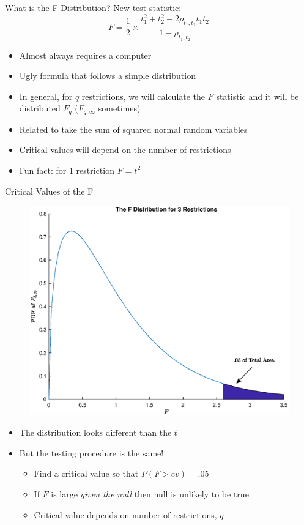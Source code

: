 \begin{frame}{What is the F Distribution?}
New test statistic:
		\[
			F = \frac{1}{2}\times\frac{t_1^2 + t_2^2 - 2\rho_{t_1,t_2}t_1t_2}{1-\rho_{t_1,t_2}}
		\]

\begin{itemize}
	\item Almost always requires a computer
	\item Ugly formula that follows a simple distribution
	\item In general, for $q$ restrictions, we will calculate the $F$ statistic and it will be distributed $F_q$ ($F_{q,\infty}$ sometimes)
	\item Related to take the sum of squared normal random variables
	\item Critical values will depend on the number of restrictions
	\item Fun fact: for 1 restriction $F = t^2$
\end{itemize}

	
\end{frame}

\begin{frame}{Critical Values of the F}

\begin{figure}
\centering
	\includegraphics[width=.45\textwidth]{fDistributionk3.eps}	
\end{figure}

\vspace{-5mm}

\begin{itemize}
	\item The distribution looks different than the $t$
	\item But the testing procedure is the same!
	\begin{itemize}
		\item Find a critical value so that $P(F>cv)=.05$
		\item If $F$ is large \emph{given the null} then null is unlikely to be true
		\item Critical value depends on number of restrictions, $q$
	\end{itemize}	
\end{itemize}

\end{frame}




